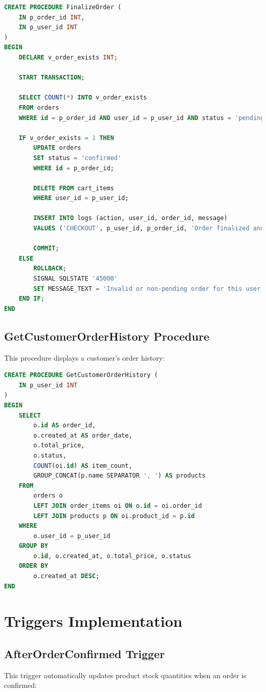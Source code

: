\documentclass{article}
\begin{document}
\begin{lstlisting}[language=SQL]
CREATE PROCEDURE FinalizeOrder (
    IN p_order_id INT,
    IN p_user_id INT
)
BEGIN
    DECLARE v_order_exists INT;

    START TRANSACTION;

    SELECT COUNT(*) INTO v_order_exists
    FROM orders
    WHERE id = p_order_id AND user_id = p_user_id AND status = 'pending';

    IF v_order_exists = 1 THEN
        UPDATE orders
        SET status = 'confirmed'
        WHERE id = p_order_id;

        DELETE FROM cart_items
        WHERE user_id = p_user_id;

        INSERT INTO logs (action, user_id, order_id, message)
        VALUES ('CHECKOUT', p_user_id, p_order_id, 'Order finalized and cart emptied');

        COMMIT;
    ELSE
        ROLLBACK;
        SIGNAL SQLSTATE '45000'
        SET MESSAGE_TEXT = 'Invalid or non-pending order for this user';
    END IF;
END
\end{lstlisting}

\subsection{GetCustomerOrderHistory Procedure}
This procedure displays a customer's order history:

\begin{lstlisting}[language=SQL]
CREATE PROCEDURE GetCustomerOrderHistory (
    IN p_user_id INT
)
BEGIN
    SELECT
        o.id AS order_id,
        o.created_at AS order_date,
        o.total_price,
        o.status,
        COUNT(oi.id) AS item_count,
        GROUP_CONCAT(p.name SEPARATOR ', ') AS products
    FROM
        orders o
        LEFT JOIN order_items oi ON o.id = oi.order_id
        LEFT JOIN products p ON oi.product_id = p.id
    WHERE
        o.user_id = p_user_id
    GROUP BY
        o.id, o.created_at, o.total_price, o.status
    ORDER BY
        o.created_at DESC;
END
\end{lstlisting}

\section{Triggers Implementation}

\subsection{AfterOrderConfirmed Trigger}
This trigger automatically updates product stock quantities when an order is confirmed:
\end{document}
